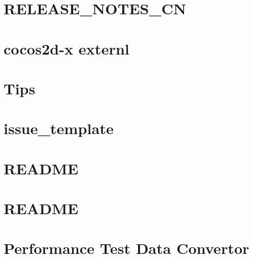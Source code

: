 \documentclass[twoside]{book}
\newcommand{\+}{\discretionary{\mbox{\scriptsize$\hookleftarrow$}}{}{}}
\begin{document}
\chapter{R\+E\+L\+E\+A\+S\+E\+\_\+\+N\+O\+T\+E\+S\+\_\+\+CN}
\label{md__home_pmx_git_PMX_SimuCocos3_cocos2d_docs_RELEASE_NOTES_CN}

\chapter{cocos2d-\/x externl}
\label{md__home_pmx_git_PMX_SimuCocos3_cocos2d_external_README}

\chapter{Tips}
\label{md__home_pmx_git_PMX_SimuCocos3_cocos2d_external_win32-specific_zlib_Readme}

\chapter{issue\+\_\+template}
\label{md__home_pmx_git_PMX_SimuCocos3_cocos2d_issue_template}

\chapter{R\+E\+A\+D\+ME}
\label{md__home_pmx_git_PMX_SimuCocos3_cocos2d_README}

\chapter{R\+E\+A\+D\+ME}
\label{md__home_pmx_git_PMX_SimuCocos3_cocos2d_tools_fbx-conv_README}

\chapter{Performance Test Data Convertor}
\label{md__home_pmx_git_PMX_SimuCocos3_cocos2d_tools_performance-analyze_README}

\end{document}
